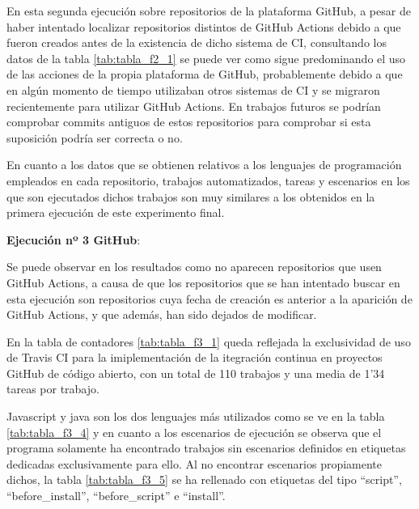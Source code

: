 \begin{compactitem}
    En esta segunda ejecución sobre repositorios de la plataforma GitHub, a pesar de haber intentado localizar repositorios distintos de GitHub Actions debido a que fueron creados antes de la existencia de dicho sistema de CI, consultando los datos de la tabla \ref{tab:tabla_f2_1} se puede ver como sigue predominando el uso de las acciones de la propia plataforma de GitHub, probablemente debido a que en algún momento de tiempo utilizaban otros sistemas de CI y se migraron recientemente para utilizar GitHub Actions. En trabajos futuros se podrían comprobar commits antiguos de estos repositorios para comprobar si esta suposición podría ser correcta o no.
    
    En cuanto a los datos que se obtienen relativos a los lenguajes de programación empleados en cada repositorio, trabajos automatizados, tareas y escenarios en los que son ejecutados dichos trabajos son muy similares a los obtenidos en la primera ejecución de este experimento final.
    
    \item \textbf{Ejecución nº 3 GitHub}:
    
    Se puede observar en los resultados como no aparecen repositorios que usen GitHub Actions, a causa de que los repositorios que se han intentado buscar en esta ejecución son repositorios cuya fecha de creación es anterior a la aparición de GitHub Actions, y que además, han sido dejados de modificar.

    En la tabla de contadores \ref{tab:tabla_f3_1} queda reflejada la exclusividad de uso de Travis CI para la imiplementación de la itegración continua en proyectos GitHub de código abierto, con un total de 110 trabajos y una media de 1'34 tareas por trabajo.

    Javascript y java son los dos lenguajes más utilizados como se ve en la tabla \ref{tab:tabla_f3_4} y en cuanto a los escenarios de ejecución se observa que el programa solamente ha encontrado trabajos sin escenarios definidos en etiquetas dedicadas exclusivamente para ello. Al no encontrar escenarios propiamente dichos, la tabla \ref{tab:tabla_f3_5} se ha rellenado con etiquetas del tipo ``script'', ``before\_install'', ``before\_script'' e ``install''.
\end{compactitem}
